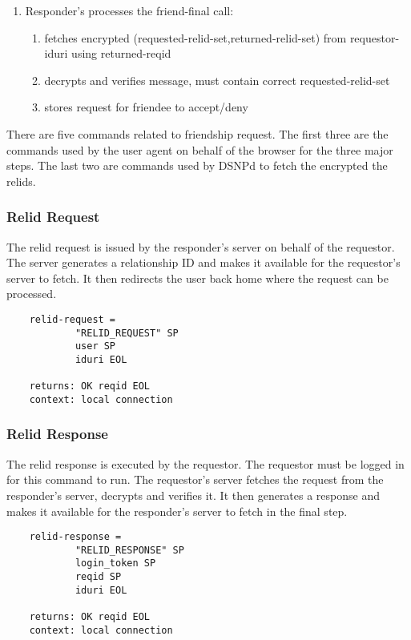 \documentclass[letterpaper,11pt,oneside]{article}
\begin{document}
\begin{enumerate}
\item Responder's processes the friend-final call:
    \begin{enumerate}
    \item fetches encrypted (requested-relid-set,returned-relid-set) from requestor-iduri using returned-reqid
    \item decrypts and verifies message, must contain correct requested-relid-set
    \item stores request for friendee to accept/deny
    \end{enumerate}
\end{enumerate}

There are five commands related to friendship request. The first three are the
commands used by the user agent on behalf of the browser for the three major
steps. The last two are commands used by DSNPd to fetch the encrypted the
relids.

\subsubsection{Relid Request}

The relid request is issued by the responder's server on behalf of the
requestor. The server generates a relationship ID and makes it available for
the requestor's server to fetch. It then redirects the user back home where the
request can be processed.

\vspace{10pt}
\begin{verbatim}
    relid-request =
            "RELID_REQUEST" SP
            user SP 
            iduri EOL

    returns: OK reqid EOL
    context: local connection
\end{verbatim}
\vspace{10pt}


\subsubsection{Relid Response}

The relid response is executed by the requestor. The requestor must be logged
in for this command to run. The requestor's server fetches the request from the
responder's server, decrypts and verifies it. It then generates a response and
makes it available for the responder's server to fetch in the final step.

\vspace{10pt}
\begin{verbatim}
    relid-response = 
            "RELID_RESPONSE" SP
            login_token SP
            reqid SP
            iduri EOL

    returns: OK reqid EOL
    context: local connection
\end{verbatim}
\vspace{10pt}
\end{document}
